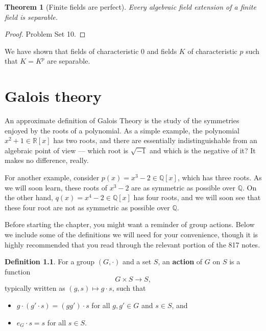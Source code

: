 \documentclass[12pt]{report}
\newtheorem{theorem}{Theorem}[chapter]
\numberwithin{equation}{section}
\numberwithin{theorem}{chapter}
\theoremstyle{definition}
\newtheorem{definition}[theorem]{Definition}
\newtheorem*{basic properties}{Basic Properties}
\newtheorem*{Important Remark}{Important Remark}
\newcommand{\df}[1]{{\bf #1}\index{#1}}
\newcommand{\R}{\mathbb{R}}
\newcommand{\Q}{\mathbb{Q}}
\begin{document}
\begin{theorem}[Finite fields are perfect]\label{alg ext finite field separable}
 Every algebraic field extension of a finite field is separable.
\end{theorem}


\begin{proof}
	Problem Set 10.
\end{proof}


We have shown that fields of characteristic $0$ and fields $K$ of characteristic $p$ such that $K=K^p$ are separable.






\chapter{Galois theory}



An approximate definition of Galois Theory is the study of the symmetries enjoyed by the roots of a polynomial. As a simple example, the polynomial $x^2 + 1 \in \R[x]$ has two roots, and there are essentially indistinguishable from an algebraic point of view --- which root is $\sqrt{-1}$ and which is the negative of it? It makes no difference, really.

For another example, consider $p(x) = x^3 -2 \in \Q[x]$, which has three roots. As we will soon learn, these roots of $x^3 - 2$ are as symmetric as possible over $\Q$. On the other hand, $q(x) = x^4 - 2 \in \Q[x]$ has four roots, and we will soon see that these four root are not as symmetric as possible over $\Q$. 





Before starting the chapter, you might want a reminder of group actions. Below we include some of the definitions we will need for your convenience, though it is highly recommended that you read through the relevant portion of the 817 notes.

\begin{definition}
For a group $(G, \cdot)$ and a set $S$, an \df{action} of $G$ on $S$ is a function
$$G \times S \to S,$$
typically written as $(g,s) \mapsto g \cdot s$, such that
\begin{itemize}
\item $g \cdot (g' \cdot s) = (g g') \cdot s$ for all $g,g' \in G$ and $s\in S$, and
\item $e_G \cdot s = s$ for all $s \in S$.
\end{itemize}
\end{definition}
\end{document}
